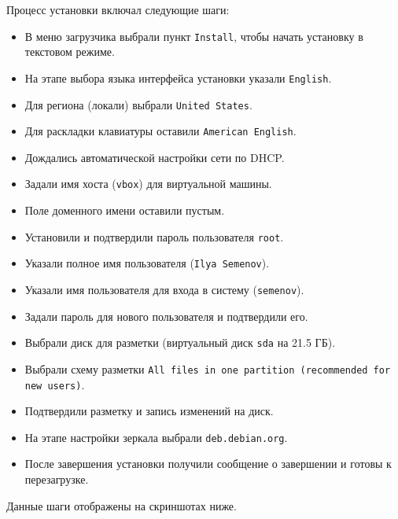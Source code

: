 Процесс установки включал следующие шаги:
\begin{itemize}
    \item В меню загрузчика выбрали пункт \texttt{Install}, чтобы начать установку в текстовом режиме.
    \item На этапе выбора языка интерфейса установки указали \texttt{English}.
    \item Для региона (локали) выбрали \texttt{United States}.
    \item Для раскладки клавиатуры оставили \texttt{American English}.
    \item Дождались автоматической настройки сети по DHCP.
    \item Задали имя хоста (\texttt{vbox}) для виртуальной машины.
    \item Поле доменного имени оставили пустым.
    \item Установили и подтвердили пароль пользователя \texttt{root}.
 \item Указали полное имя пользователя (\texttt{Ilya Semenov}).
    \item Указали имя пользователя для входа в систему (\texttt{semenov}).
    \item Задали пароль для нового пользователя и подтвердили его.
    \item Выбрали диск для разметки (виртуальный диск \texttt{sda} на 21.5 ГБ).
    \item Выбрали схему разметки \texttt{All files in one partition (recommended for new users)}.
    \item Подтвердили разметку и запись изменений на диск.
    \item На этапе настройки зеркала выбрали \texttt{deb.debian.org}.
    \item После завершения установки получили сообщение о завершении и готовы к перезагрузке.
\end{itemize}

Данные шаги отображены на скриншотах ниже.

